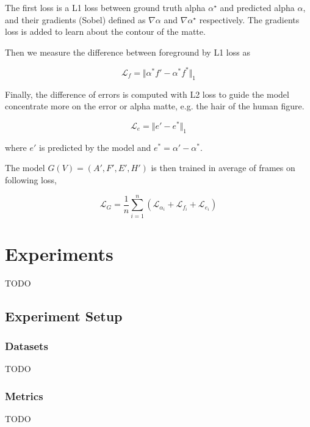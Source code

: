 \documentclass[final]{cvpr}
\begin{document}
The first loss is a L1 loss between ground truth alpha $\alpha^\star$ and predicted alpha $\alpha$, and their gradients (Sobel) defined as $\nabla \alpha$ and $\nabla \alpha^\star$ respectively. The gradients loss is added to learn about the contour of the matte.

Then we measure the difference between foreground by L1 loss as

\begin{equation}
    \mathcal{L}_f=\Vert\alpha^*f'-\alpha^*f^*\Vert_1
\end{equation}\label{lossForeground}

Finally, the difference of errors is computed with L2 loss to guide the model concentrate more on the error or alpha matte, e.g. the hair of the human figure.

\begin{equation}
    \mathcal{L}_e=\Vert e'-e^*\Vert_1
\end{equation}\label{lossError}

where $e'$ is predicted by the model and $e^*=\alpha'-\alpha^*$.

The model $G(V)=(A',F',E',H')$ is then trained in average of frames on following loss,

\begin{equation}
    \mathcal{L}_G=\frac{1}{n}\sum_{i=1}^{n}\left(\mathcal{L}_{\alpha_i}+\mathcal{L}_{f_i}+\mathcal{L}_{e_i}\right)
\end{equation}\label{lossG}

\section{Experiments}

TODO

\subsection{Experiment Setup}

\subsubsection{Datasets}

TODO

\subsubsection{Metrics}

TODO
\end{document}
